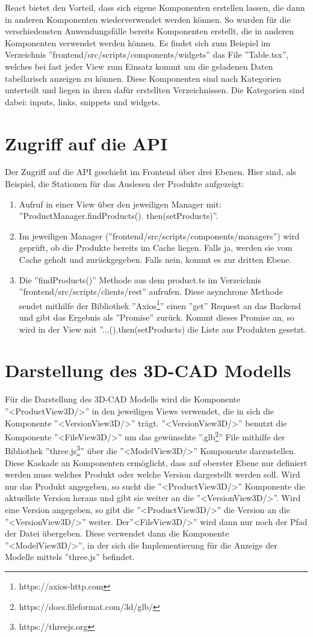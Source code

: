 React bietet den Vorteil, dass sich eigene Komponenten erstellen lassen, die dann in anderen Komponenten wiederverwendet werden können. So wurden für die verschiedensten Anwendungsfälle bereits Komponenten erstellt, die in anderen Komponenten verwendet werden können. Es findet sich zum Beispiel im Verzeichnis ''frontend/src/scripts/components/widgets'' das File ''Table.tsx'', welches bei fast jeder View zum Einsatz kommt um die geladenen Daten tabellarisch anzeigen zu können. Diese Komponenten sind nach Kategorien unterteilt und liegen in ihren dafür erstellten Verzeichnissen. Die Kategorien sind dabei: inputs, links, snippets und widgets. 

\section{Zugriff auf die API}
Der Zugriff auf die API geschieht im Frontend über drei Ebenen. Hier sind, als Beispiel, die Stationen für das Auslesen der Produkte aufgezeigt:
\begin{enumerate}
	\item Aufruf in einer View über den jeweiligen Manager mit: ''ProductManager.findProducts(). then(setProducts)''. 
	\item Im jeweiligen Manager (''frontend/src/scripts/components/managers'') wird geprüft, ob die Produkte bereits im Cache liegen. Falls ja, werden sie vom Cache geholt und zurückgegeben. Falls nein, kommt es zur dritten Ebene.
	\item Die ''findProducts()'' Methode aus dem product.ts im Verzeichnis ''frontend/src/scripts/clients/rest'' aufrufen. Diese asynchrone Methode sendet mithilfe der Bibliothek ''Axios\footnote{https://axios-http.com}'' einen ''get'' Request an das Backend und gibt das Ergebnis als ''Promise'' zurück. Kommt dieses Promise an, so wird in der View mit ''...().then(setProducts) die Liste aus Produkten gesetzt.
\end{enumerate}

\section{Darstellung des 3D-CAD Modells}
Für die Darstellung des 3D-CAD Modells wird die Komponente ''<ProductView3D/>'' in den jeweiligen Views verwendet, die in sich die Komponente ''<VersionView3D/>'' trägt. ''<VersionView3D/>'' benutzt die Komponente ''<FileView3D/>'' um das gewünschte ''.glb\footnote{https://docs.fileformat.com/3d/glb/}'' File mithilfe der Bibliothek ''three.js\footnote{https://threejs.org}'' über die  ''<ModelView3D/>'' Komponente darzustellen. Diese Kaskade an Komponenten ermöglicht, dass auf oberster Ebene nur definiert werden muss welches Produkt oder welche Version dargestellt werden soll. Wird nur das Produkt angegeben, so sucht die ''<ProductView3D/>'' Komponente die aktuellste Version heraus und gibt sie weiter an die ''<VersionView3D/>''. Wird eine Version angegeben, so gibt die ''<ProductView3D/>'' die Version an die ''<VersionView3D/>'' weiter. Der''<FileView3D/>'' wird dann nur noch der Pfad der Datei übergeben. Diese verwendet dann die Komponente  ''<ModelView3D/>'', in der sich die Implementierung für die Anzeige der Modelle mittels ''three.js'' befindet.